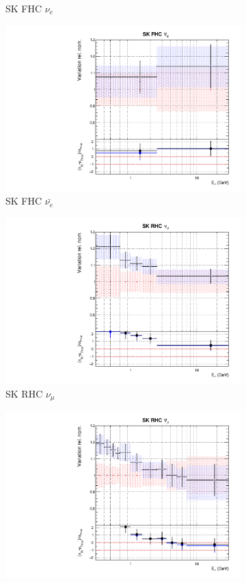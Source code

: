 \begin{figure}
\begin{subfigure}{0.24\textwidth}
  \caption{SK FHC $\nu_e$}
\end{subfigure}
\begin{subfigure}{0.24\textwidth}
  \centering
  \includegraphics[width=0.95\linewidth]{figs/fixed2p2hflux11}
  \caption{SK FHC $\bar{\nu_{e}}$}
\end{subfigure}
\begin{subfigure}{0.24\textwidth}
  \centering
  \includegraphics[width=0.95\linewidth]{figs/fixed2p2hflux12}
  \caption{SK RHC $\nu_{\mu}$}
\end{subfigure}
\begin{subfigure}{0.24\textwidth}
  \centering
  \includegraphics[width=0.95\linewidth]{figs/fixed2p2hflux13}

\end{subfigure}
\end{figure}
